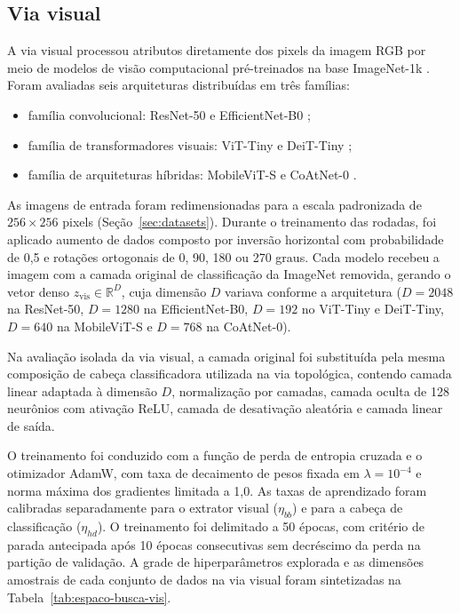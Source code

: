 \subsection{Via visual}
\label{subsec:via-visual}
\label{subsec:ext-hibrido}

A via visual processou atributos diretamente dos pixels da imagem RGB por meio de modelos de visão computacional pré-treinados na base ImageNet-1k \cite{imagenet}. Foram avaliadas seis arquiteturas distribuídas em três famílias:
\begin{itemize}
    \item família convolucional: ResNet-50 \cite{he2016deep} e EfficientNet-B0 \cite{tan2019efficientnet};
    \item família de transformadores visuais: ViT-Tiny \cite{dosovitskiy2020image} e DeiT-Tiny \cite{touvron2021training};
    \item família de arquiteturas híbridas: MobileViT-S \cite{mehta2022mobilevit} e CoAtNet-0 \cite{dai2021coatnet}.
\end{itemize}

As imagens de entrada foram redimensionadas para a escala padronizada de $256 \times 256$ pixels (Seção~\ref{sec:datasets}). Durante o treinamento das rodadas, foi aplicado aumento de dados composto por inversão horizontal com probabilidade de 0,5 e rotações ortogonais de 0, 90, 180 ou 270 graus. Cada modelo recebeu a imagem com a camada original de classificação da ImageNet removida, gerando o vetor denso $z_{\mathrm{vis}} \in \mathbb{R}^{D}$, cuja dimensão $D$ variava conforme a arquitetura ($D=2048$ na ResNet-50, $D=1280$ na EfficientNet-B0, $D=192$ no ViT-Tiny e DeiT-Tiny, $D=640$ na MobileViT-S e $D=768$ na CoAtNet-0).

Na avaliação isolada da via visual, a camada original foi substituída pela mesma composição de cabeça classificadora utilizada na via topológica, contendo camada linear adaptada à dimensão $D$, normalização por camadas, camada oculta de 128 neurônios com ativação ReLU, camada de desativação aleatória e camada linear de saída.

O treinamento foi conduzido com a função de perda de entropia cruzada e o otimizador AdamW, com taxa de decaimento de pesos fixada em $\lambda = 10^{-4}$ e norma máxima dos gradientes limitada a 1,0. As taxas de aprendizado foram calibradas separadamente para o extrator visual ($\eta_{bb}$) e para a cabeça de classificação ($\eta_{hd}$). O treinamento foi delimitado a 50 épocas, com critério de parada antecipada após 10 épocas consecutivas sem decréscimo da perda na partição de validação. A grade de hiperparâmetros explorada e as dimensões amostrais de cada conjunto de dados na via visual foram sintetizadas na Tabela~\ref{tab:espaco-busca-vis}.

